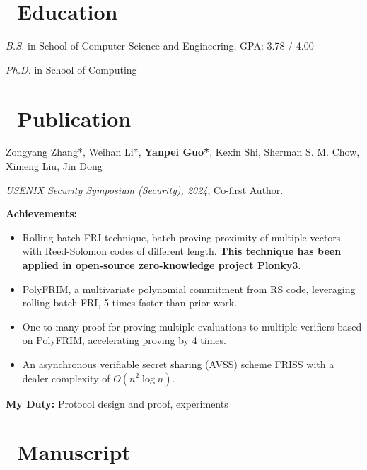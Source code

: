 \documentclass{resume}
\begin{document}



\section{\faGraduationCap\ Education}
\textit{B.S.} in School of Computer Science and Engineering, GPA: 3.78 / 4.00


\textit{Ph.D.} in School of Computing

\section{\faBook\ Publication}

Zongyang Zhang*, Weihan Li*, \textbf{Yanpei Guo*}, Kexin Shi, Sherman S. M. Chow, Ximeng Liu, Jin Dong

\textit{USENIX Security Symposium (Security), 2024}, Co-first Author.

\textbf{Achievements:}
\begin{itemize}
  \item Rolling-batch FRI technique, batch proving proximity of multiple vectors with Reed-Solomon codes of different length. 
  \textbf{This technique has been applied in open-source zero-knowledge project Plonky3}.
  \item PolyFRIM, a multivariate polynomial commitment from RS code, leveraging rolling batch FRI, 5 times faster than prior work.
  \item One-to-many proof for proving multiple evaluations to multiple verifiers based on PolyFRIM, accelerating proving by 4 times.
  \item An asynchronous verifiable secret sharing (AVSS) scheme FRISS with a dealer complexity of $O(n^2 \log n)$. 
\end{itemize}
\textbf{My Duty:} Protocol design and proof, experiments

\section{\faBookmark\ Manuscript}
\end{document}
